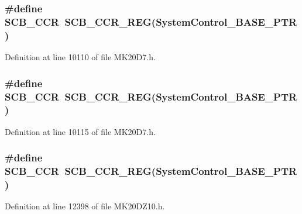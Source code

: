 \subsubsection[{\texorpdfstring{S\+C\+B\+\_\+\+C\+CR}{SCB_CCR}}]{\setlength{\rightskip}{0pt plus 5cm}\#define S\+C\+B\+\_\+\+C\+CR~{\bf S\+C\+B\+\_\+\+C\+C\+R\+\_\+\+R\+EG}({\bf System\+Control\+\_\+\+B\+A\+S\+E\+\_\+\+P\+TR})}\hypertarget{group___s_c_b___register___accessor___macros_ga899566f16668d16cc5f7c7a1e9025bdd}{}\label{group___s_c_b___register___accessor___macros_ga899566f16668d16cc5f7c7a1e9025bdd}


Definition at line 10110 of file M\+K20\+D7.\+h.

\subsubsection[{\texorpdfstring{S\+C\+B\+\_\+\+C\+CR}{SCB_CCR}}]{\setlength{\rightskip}{0pt plus 5cm}\#define S\+C\+B\+\_\+\+C\+CR~{\bf S\+C\+B\+\_\+\+C\+C\+R\+\_\+\+R\+EG}({\bf System\+Control\+\_\+\+B\+A\+S\+E\+\_\+\+P\+TR})}\hypertarget{group___s_c_b___register___accessor___macros_ga899566f16668d16cc5f7c7a1e9025bdd}{}\label{group___s_c_b___register___accessor___macros_ga899566f16668d16cc5f7c7a1e9025bdd}


Definition at line 10115 of file M\+K20\+D7.\+h.

\subsubsection[{\texorpdfstring{S\+C\+B\+\_\+\+C\+CR}{SCB_CCR}}]{\setlength{\rightskip}{0pt plus 5cm}\#define S\+C\+B\+\_\+\+C\+CR~{\bf S\+C\+B\+\_\+\+C\+C\+R\+\_\+\+R\+EG}({\bf System\+Control\+\_\+\+B\+A\+S\+E\+\_\+\+P\+TR})}\hypertarget{group___s_c_b___register___accessor___macros_ga899566f16668d16cc5f7c7a1e9025bdd}{}\label{group___s_c_b___register___accessor___macros_ga899566f16668d16cc5f7c7a1e9025bdd}


Definition at line 12398 of file M\+K20\+D\+Z10.\+h.

